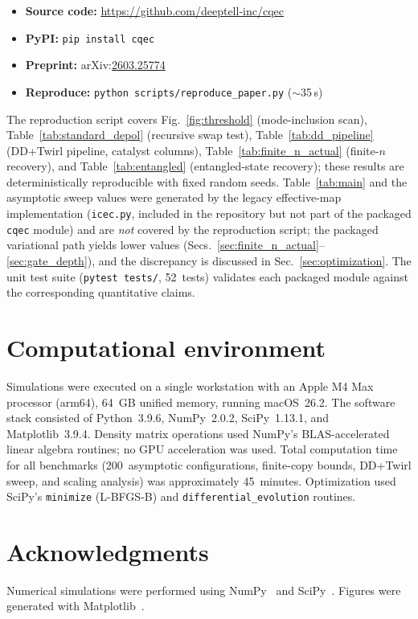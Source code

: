 \documentclass[a4paper,twocolumn]{quantumarticle}
\begin{document}
\begin{itemize}
\item \textbf{Source code:} \url{https://github.com/deeptell-inc/cqec}
\item \textbf{PyPI:} \texttt{pip\,install\,cqec}
\item \textbf{Preprint:} arXiv:\href{https://doi.org/10.48550/arXiv.2603.25774}{2603.25774}
\item \textbf{Reproduce:} \texttt{python\,scripts/}\allowbreak\texttt{reproduce\_paper.py} ($\sim$35\,s)
\end{itemize}

The reproduction script covers Fig.~\ref{fig:threshold} (mode-inclusion scan), Table~\ref{tab:standard_depol} (recursive swap test), Table~\ref{tab:dd_pipeline} (DD+Twirl pipeline, catalyst columns), Table~\ref{tab:finite_n_actual} (finite-$n$ recovery), and Table~\ref{tab:entangled} (entangled-state recovery); these results are deterministically reproducible with fixed random seeds.
Table~\ref{tab:main} and the asymptotic sweep values were generated by the legacy effective-map implementation (\texttt{icec.py}, included in the repository but not part of the packaged \texttt{cqec} module) and are \emph{not} covered by the reproduction script; the packaged variational path yields lower values (Secs.~\ref{sec:finite_n_actual}--\ref{sec:gate_depth}), and the discrepancy is discussed in Sec.~\ref{sec:optimization}.
The unit test suite (\texttt{pytest tests/}, 52~tests) validates each packaged module against the corresponding quantitative claims.


\section*{Computational environment}

Simulations were executed on a single workstation with an Apple M4 Max processor (arm64), 64~GB unified memory, running macOS~26.2.
The software stack consisted of Python~3.9.6, NumPy~2.0.2, SciPy~1.13.1, and Matplotlib~3.9.4.
Density matrix operations used NumPy's BLAS-accelerated linear algebra routines; no GPU acceleration was used.
Total computation time for all benchmarks (200~asymptotic configurations, finite-copy bounds, DD+Twirl sweep, and scaling analysis) was approximately 45~minutes.
Optimization used SciPy's \texttt{minimize} (L-BFGS-B) and \texttt{differential\allowbreak\_evolution} routines.


\section*{Acknowledgments}

Numerical simulations were performed using NumPy~\cite{numpy2020} and SciPy~\cite{scipy2020}.
Figures were generated with Matplotlib~\cite{Hunter2007}.




\end{document}
